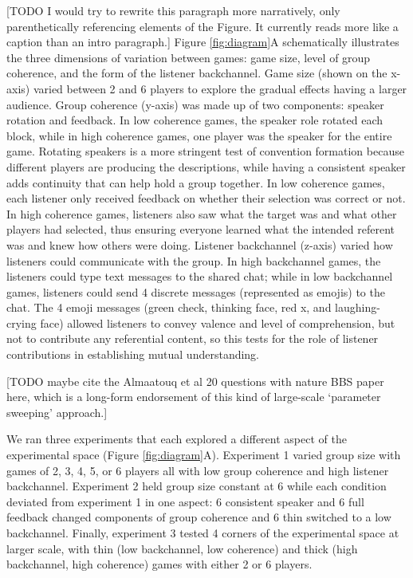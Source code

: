 \documentclass[
  english,
  a4paper,
]{article}
\begin{document}
{[}TODO I would try to rewrite this paragraph more narratively, only parenthetically referencing elements of the Figure. It currently reads more like a caption than an intro paragraph.{]}
Figure \ref{fig:diagram}A schematically illustrates the three dimensions of variation between games: game size, level of group coherence, and the form of the listener backchannel. Game size (shown on the x-axis) varied between 2 and 6 players to explore the gradual effects having a larger audience. Group coherence (y-axis) was made up of two components: speaker rotation and feedback. In low coherence games, the speaker role rotated each block, while in high coherence games, one player was the speaker for the entire game. Rotating speakers is a more stringent test of convention formation because different players are producing the descriptions, while having a consistent speaker adds continuity that can help hold a group together. In low coherence games, each listener only received feedback on whether their selection was correct or not. In high coherence games, listeners also saw what the target was and what other players had selected, thus ensuring everyone learned what the intended referent was and knew how others were doing. Listener backchannel (z-axis) varied how listeners could communicate with the group. In high backchannel games, the listeners could type text messages to the shared chat; while in low backchannel games, listeners could send 4 discrete messages (represented as emojis) to the chat. The 4 emoji messages (green check, thinking face, red x, and laughing-crying face) allowed listeners to convey valence and level of comprehension, but not to contribute any referential content, so this tests for the role of listener contributions in establishing mutual understanding.

{[}TODO maybe cite the Almaatouq et al 20 questions with nature BBS paper here, which is a long-form endorsement of this kind of large-scale `parameter sweeping' approach.{]}

We ran three experiments that each explored a different aspect of the experimental space (Figure \ref{fig:diagram}A). Experiment 1 varied group size with games of 2, 3, 4, 5, or 6 players all with low group coherence and high listener backchannel. Experiment 2 held group size constant at 6 while each condition deviated from experiment 1 in one aspect: 6 consistent speaker and 6 full feedback changed components of group coherence and 6 thin switched to a low backchannel. Finally, experiment 3 tested 4 corners of the experimental space at larger scale, with thin (low backchannel, low coherence) and thick (high backchannel, high coherence) games with either 2 or 6 players.
\end{document}
